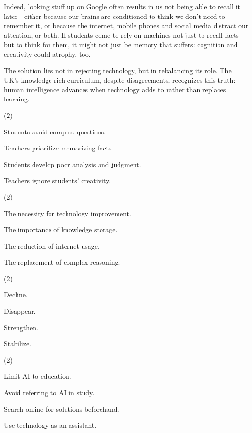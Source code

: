 \documentclass{英语试卷}
\begin{document}
\par Indeed, looking stuff up on Google often results in us not being able to recall it later—either because our brains are conditioned to think we don't need to remember it, or because the internet, mobile phones and social media distract our attention, or both. If students come to rely on machines not just to recall facts but to think for them, it might not just be memory that suffers: cognition and creativity could atrophy, too.\par
\par The solution lies not in rejecting technology, but in rebalancing its role. The UK's knowledge-rich curriculum, despite disagreements, recognizes this truth: human intelligence advances when technology adds to rather than replaces learning.\par
{}
\begin{choices}(2)
  \item Students avoid complex questions.
  \item Teachers prioritize memorizing facts.
  \item Students develop poor analysis and judgment.
  \item Teachers ignore students' creativity.
\end{choices}
\begin{choices}(2)
  \item The necessity for technology improvement.
  \item The importance of knowledge storage.
  \item The reduction of internet usage.
  \item The replacement of complex reasoning.
\end{choices}
\begin{choices}(2)
  \item Decline.
  \item Disappear.
  \item Strengthen.
  \item Stabilize.
\end{choices}
\begin{choices}(2)
  \item Limit AI to education.
  \item Avoid referring to AI in study.
  \item Search online for solutions beforehand.
  \item Use technology as an assistant.
\end{choices}
\end{document}
